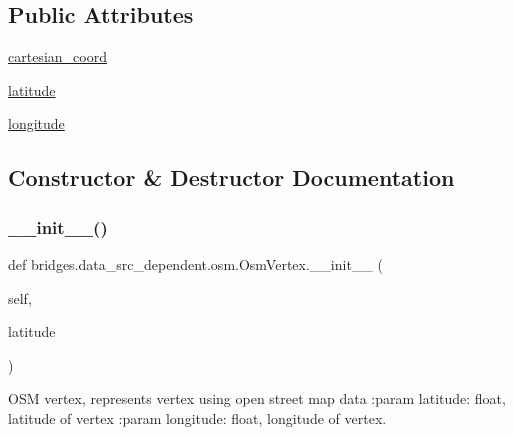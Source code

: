 \subsection*{Public Attributes}
\begin{DoxyCompactItemize}
\item 
\mbox{\hyperlink{classbridges_1_1data__src__dependent_1_1osm_1_1_osm_vertex_a5f7c71b790312e337d344a311d5b0fae}{cartesian\+\_\+coord}}
\item 
\mbox{\hyperlink{classbridges_1_1data__src__dependent_1_1osm_1_1_osm_vertex_a2b346821c6310d148977b1b6212c4c59}{latitude}}
\item 
\mbox{\hyperlink{classbridges_1_1data__src__dependent_1_1osm_1_1_osm_vertex_a0dd0da0c52e3ca388cf8fbe5f613c273}{longitude}}
\end{DoxyCompactItemize}


\subsection{Constructor \& Destructor Documentation}
\mbox{\label{classbridges_1_1data__src__dependent_1_1osm_1_1_osm_vertex_a64fa8f3bfc7df74b5fa93bcc7326e6ac}} 
\subsubsection{\texorpdfstring{\+\_\+\+\_\+init\+\_\+\+\_\+()}{\_\_init\_\_()}}
{\footnotesize\ttfamily def bridges.\+data\+\_\+src\+\_\+dependent.\+osm.\+Osm\+Vertex.\+\_\+\+\_\+init\+\_\+\+\_\+ (\begin{DoxyParamCaption}\item[{}]{self,  }\item[{}]{latitude }\end{DoxyParamCaption})}



O\+SM vertex, represents vertex using open street map data \+:param latitude\+: float, latitude of vertex \+:param longitude\+: float, longitude of vertex. 



